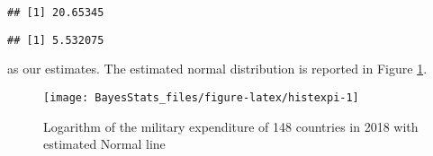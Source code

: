 \documentclass[
]{book}
\newenvironment{Shaded}{\begin{snugshade}}{\end{snugshade}}
\newcommand{\AttributeTok}[1]{\textcolor[rgb]{0.77,0.63,0.00}{#1}}
\newcommand{\FunctionTok}[1]{\textcolor[rgb]{0.00,0.00,0.00}{#1}}
\newcommand{\NormalTok}[1]{#1}
\newcommand{\SpecialCharTok}[1]{\textcolor[rgb]{0.00,0.00,0.00}{#1}}
\begin{document}
\begin{Shaded}
\end{Shaded}

\begin{verbatim}
## [1] 20.65345
\end{verbatim}

\begin{Shaded}
\end{Shaded}

\begin{verbatim}
## [1] 5.532075
\end{verbatim}

as our estimates. The estimated normal distribution is reported in Figure \ref{fig:histexpi}.

\begin{Shaded}
\end{Shaded}

\begin{figure}

{\centering \texttt{[image: BayesStats\_files/figure-latex/histexpi-1]} 

}

\caption{Logarithm of the military expenditure of 148 countries in 2018 with estimated Normal line}\label{fig:histexpi}
\end{figure}
\end{document}
